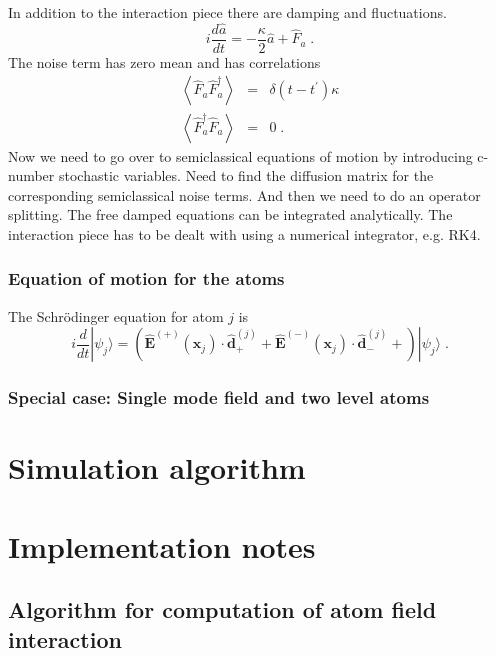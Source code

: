 \documentclass[aps, superscriptaddress, groupedaddress, preprint]{revtex4}
\renewcommand\vec{\mathbf}
\begin{document}
In addition to the interaction piece there are damping
and fluctuations.
\begin{equation}
i\frac{d\hat a}{dt}=
-\frac{\kappa}{2}\hat a + \hat F_a\;.
\end{equation}
The noise term has zero mean and has correlations
\begin{eqnarray}
\left<\hat F_a\hat F_a^\dagger\right>&=&\delta(t-t^\prime)\kappa\\
\left<\hat F_a^\dagger\hat F_a\right>&=&0\;.
\end{eqnarray}
Now we need to go over to semiclassical equations of motion by
introducing c-number stochastic variables.  Need to find the
diffusion matrix for the corresponding semiclassical noise terms.
And then we need to do an operator splitting.  The free damped
equations can be integrated analytically.  The interaction piece
has to be dealt with using a numerical integrator, e.g. RK4.


\subsubsection{Equation of motion for the atoms}

The Schr\"odinger equation for atom $j$ is
\begin{equation}
  i\frac{d}{dt}|\psi_j\rangle =
  \left(
    \vec{\hat E}^{(+)}(\vec{x}_j)\cdot \vec{\hat d}_+^{(j)} +
    \vec{\hat E}^{(-)}(\vec{x}_j)\cdot \vec{\hat d}_-^{(j)} +
  \right)
  |\psi_j\rangle\;.
\end{equation}


\subsubsection{Special case: Single mode field and two level atoms}


\section{Simulation algorithm}

\section{Implementation notes}


\subsection{Algorithm for computation of atom field interaction}
\end{document}
